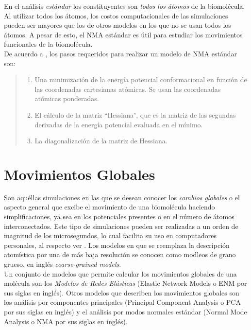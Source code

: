 En el an\'{a}lisis \textit{est\'{a}ndar} los constituyentes son \textit{todos los \'{a}tomos} de la biomol\'{e}cula. Al utilizar todos los \'{a}tomos, los costos computacionales de las simulaciones pueden ser mayores que los de otros modelos en los que no se usan todos los \'{a}tomos. A pesar de esto, el NMA est\'{a}ndar es \'{u}til para estudiar los movimientos funcionales de la biomol\'{e}cula.\\

De acuerdo a \cite{Hayward2008}, los pasos requeridos para realizar un modelo de NMA est\'{a}ndar son:
\begin{quote}
 \begin{enumerate}
  \item Una minimizaci\'{o}n de la energ\'{i}a potencial conformacional en funci\'{o}n de las coordenadas cartesianas at\'{o}micas. Se usan las coordenadas at\'{o}micas ponderadas.
  \item El c\'{a}lculo de la matriz ``Hessiana", que es la matriz de las segundas derivadas de la energ\'{i}a potencial evaluada en el m\'{i}nimo. 
  \item La diagonalizaci\'{o}n de la matriz de Hessiana.
 \end{enumerate}
\end{quote}


\section{Movimientos Globales}

Son aqu\'{e}llas simulaciones en las que se desean conocer los \textit{cambios globales} o el aspecto general que excibe el movimiento de una biomol\'{e}cula haciendo simplificaciones, ya sea en los potenciales presentes o en el n\'{u}mero de \'{a}tomos interconectados. Este tipo de simulaciones pueden ser realizadas a un orden de magnitud de los microsegundos, lo cual facilita su uso en computadores personales, al respecto ver \cite{Gur2013}. Los modelos en que se reemplaza la descripci\'{o}n atom\'{i}stica por una de m\'{a}s baja resoluci\'{o}n se conocen como modleos de grano grueso, en ingl\'{e}s \textit{coarse-grained models}. \\

Un conjunto de modelos que permite calcular los movimientos globales de una mol\'{e}cula son los \textit{Modelos de Redes El\'{a}sticas} (Elastic Network Models o ENM por sus siglas en ingl\'{e}s).
 Otros modelos que describen los movimientos globales son los an\'{a}lisis por componentes principales (Principal Component Analysis o PCA por sus siglas en ingl\'{e}s) y el an\'{a}lisis por modos normales est\'{a}ndar (Normal Mode Analysis o NMA por sus siglas en ingl\'{e}s).
